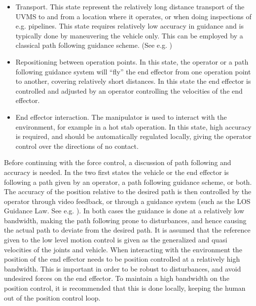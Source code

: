 \begin{itemize}
	\item Transport. This state represent the relatively long distance transport of the UVMS to and from a location where it operates, or when doing inspections of e.g. pipelines. This state requires relatively low accuracy in guidance and is typically done by maneuvering the vehicle only. This can be employed by a classical path following guidance scheme. (See e.g. \cite{fs})  
	\item Repositioning between operation points. In this state, the operator or a path following guidance system will ``fly'' the end effector from one operation point to another, covering relatively short distances. In this state the end effector is controlled and adjusted by an operator controlling the velocities of the end effector.
	\item End effector interaction. The manipulator is used to interact with the environment, for example in a hot stab operation. In this state, high accuracy is required, and should be automatically regulated locally, giving the operator control over the directions of no contact.
\end{itemize}
Before continuing with the force control, a discussion of path following and accuracy is needed. In the two first states the vehicle or the end effector is following a path given by an operator, a path following guidance scheme, or both. The accuracy of the position relative to the desired path is then controlled by the operator through video feedback, or through a guidance system (such as the LOS Guidance Law. See e.g. \cite{fs}). In both cases the guidance is done at a relatively low bandwidth, making the path following prone to disturbances, and hence causing the actual path to deviate from the desired path. It is assumed that the reference given to the low level motion control is given as the generalized and quasi velocities of the joints and vehicle. When interacting with the environment the position of the end effector needs to be position controlled at a relatively high bandwidth. This is important in order to be robust to disturbances, and avoid undesired forces on the end effector. To maintain a high bandwidth on the position control, it is recommended that this is done locally, keeping the human out of the position control loop.

